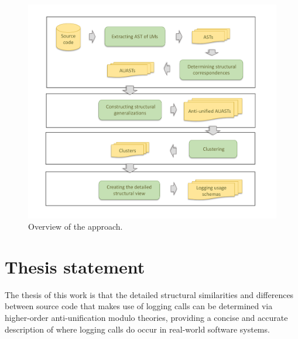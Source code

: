 


\begin{figure} [t]
  \centering\includegraphics [width = \textwidth]{Drawing4/SystemOverview.pdf}
  \caption{Overview of the approach. %
  }
  \label{fig:system_overview}
\end{figure}


\section{Thesis statement} \label{intro-stmt}
The thesis of this work is that the detailed structural similarities and differences between source code that makes use of logging calls can be determined via higher-order anti-unification modulo theories, providing a concise and accurate description of where logging calls do occur in real-world software systems.

